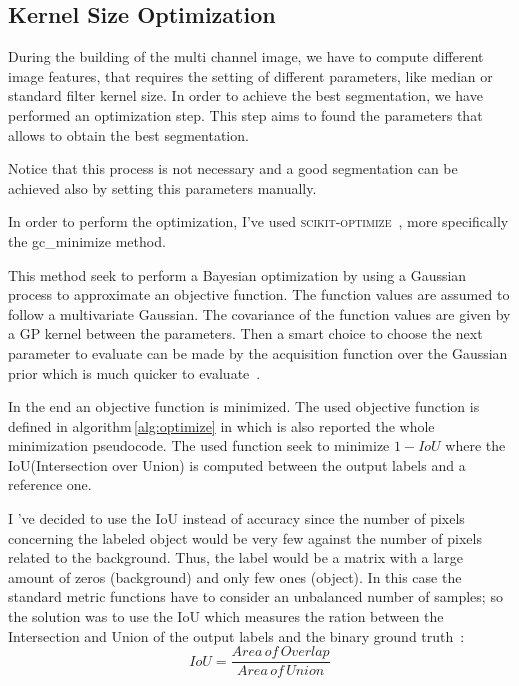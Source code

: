 \documentclass{standalone}
\begin{document}
	\subsection{Kernel Size Optimization}
	
	During the building of the multi channel image, we have to compute different image features, that requires the setting of different parameters, like median or standard filter kernel size. In order to achieve the best segmentation, we have performed an optimization step. This step aims to found the parameters that allows to obtain the best segmentation. 
	
	Notice that this process is not necessary and a good segmentation can be achieved also by setting this parameters manually.

	In order to perform the optimization, I've used \textsc{scikit-optimize}~\cite{skopt}, more specifically the gc\_minimize method.
	
	This method seek to perform a Bayesian optimization by using a Gaussian process to approximate an objective function. The function values are assumed to follow a multivariate Gaussian. The covariance of the function values are given by a GP kernel between the parameters. Then a smart choice to choose the next parameter to evaluate can be made by the acquisition function over the Gaussian prior which is much quicker to evaluate~\cite{skopt}.

	In the end an objective function is minimized. The used objective function is defined in algorithm\,\ref{alg:optimize} in which is also reported the whole minimization pseudocode. The used function seek to minimize $1 - IoU$ where the IoU(Intersection over Union) is computed between the output labels and a reference one.
	
	I 've decided to use the IoU instead of accuracy since the number of pixels concerning the labeled object would be very few against the number of pixels related to the background. Thus, the label would be a matrix with a large amount of zeros (background) and only few ones (object). In this case the standard metric functions have to consider an unbalanced number of samples; so the solution was to use the IoU which  measures the ration between the Intersection and Union of the output labels and the binary ground truth~\cite{PhDtheis}:
	\begin{equation}
		IoU = \frac{Area\,of\,Overlap}{Area\,of\,Union}
	\end{equation}
	
\end{document}
